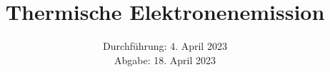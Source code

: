

\subject{\texorpdfstring{\vspace{2ex}}{}V504\texorpdfstring{\vspace{-2ex}}{}} %
\title{Thermische Elektronenemission} %
\date{
	Durchführung: 4. April 2023 %
	\\ Abgabe: 18. April 2023 %
}




\maketitle
\thispagestyle{empty}


\tableofcontents
\newpage







\printbibliography{}

\newpage



